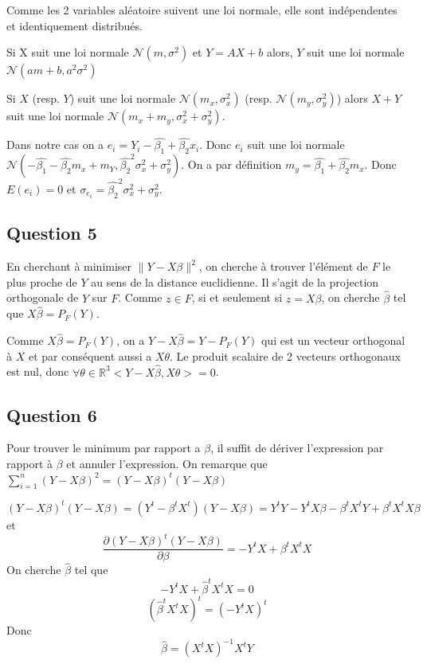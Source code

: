 \documentclass[]{book}
\theoremstyle{definition}
\newcommand{\bb}[1]{\mathbb{#1}}
\newcommand{\R}{\bb{R}}
\begin{document}
Comme les 2 variables al\'eatoire suivent une loi normale, elle sont ind\'ependentes et identiquement distribu\'es.

Si X suit une loi normale $\mathscr{N}(m, \sigma^2)$ et $Y = AX + b$ alors, $Y$ suit une loi normale $\mathscr{N}(am + b, a^2\sigma^2)$  

Si $X$ (resp. $Y$) suit une loi normale $\mathscr{N}(m_x, \sigma_x^2)$ (resp. $\mathscr{N}(m_y, \sigma_y^2)$) alors $X+Y$ suit une loi normale $\mathscr{N}(m_x + m_y, \sigma_x^2+\sigma_y^2)$.

Dans notre cas on a $e_i = Y_i - \hat{\beta_1} + \hat{\beta_2}x_i$. Donc $e_i$ suit une loi normale  
$\mathscr{N}(- \hat{\beta_1} - \hat{\beta_2}m_x + m_Y, \hat{\beta_2}^2\sigma_x^2+\sigma_y^2)$. On a par d\'efinition $m_y = \hat{\beta_1} + \hat{\beta_2}m_x$. Donc $E(e_i) = 0$ et $\sigma_{e_i} = \hat{\beta_2}^2\sigma_x^2+\sigma_y^2$.


\subsection*{Question 5}
En cherchant \`a minimiser $\lVert Y - X\beta \rVert^2$, on cherche \`a trouver l'\'el\'ement de $F$ le plus proche de $Y$ au sens de la distance euclidienne. Il s'agit de la projection orthogonale de $Y$ sur $F$. Comme $z \in F$, si et seulement si $z = X\beta$, on cherche $\hat{\beta}$ tel que $X\hat{\beta} = P_F(Y)$. 

Comme $X\hat{\beta} = P_F(Y)$, on a $Y - X\hat{\beta} = Y - P_F(Y)$ qui est un vecteur orthogonal \`a $X$ et par cons\'equent aussi a $X\theta$. Le produit scalaire de 2 vecteurs orthogonaux est nul, donc $\forall \theta \in \R^{3} <Y - X\hat{\beta}, X\theta> = 0$.

\subsection*{Question 6}
Pour trouver le minimum par rapport a $\beta$, il suffit de d\'eriver l'expression par rapport \`a $\beta$ et annuler l'expression. On remarque que $\sum_{i=1}^{n}{(Y-X\beta)^2} = (Y-X\beta)^t(Y-X\beta)$

$$
(Y-X\beta)^t(Y-X\beta) = (Y^t-\beta^tX^t)(Y-X\beta) = Y^tY-Y^tX\beta - \beta^tX^tY + \beta^tX^tX\beta
$$
et
$$
\frac{\partial (Y-X\beta)^t(Y-X\beta) }{\partial \beta} = -Y^tX + \beta^tX^tX
$$
On cherche $\hat{\beta}$ tel que
$$
-Y^tX + \hat{\beta}^tX^tX = 0
$$
$$
(\hat{\beta}^tX^tX)^t = (-Y^tX)^t
$$
Donc
$$
\hat{\beta} = (X^tX)^{-1}X^tY
$$
\end{document}
